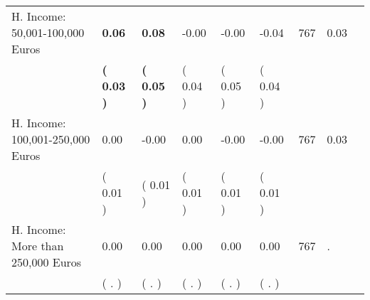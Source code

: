 \begin{tabular}{L{6.2cm} C{1.8cm} C{1.8cm} C{1.8cm} C{1.8cm} C{1.8cm} C{1.8cm} C{0.3cm} C{0.3cm}}
H. Income: 50,001-100,000 Euros & \textbf{     0.06} & \textbf{     0.08} &     -0.00 &     -0.00 &     -0.04  & 767 &       0.03 \\ 
 & \textbf{(     0.03 )} & \textbf{(     0.05 )} & (     0.04 ) & (     0.05 ) & (     0.04 )  & \\
H. Income: 100,001-250,000 Euros &      0.00 &     -0.00 &      0.00 &     -0.00 &     -0.00  & 767 &       0.03 \\ 
 & (     0.01 ) & (     0.01 ) & (     0.01 ) & (     0.01 ) & (     0.01 )  & \\
H. Income: More than 250,000 Euros &      0.00 &      0.00 &      0.00 &      0.00 &      0.00  & 767 &          . \\ 
 & (        . ) & (        . ) & (        . ) & (        . ) & (        . )  & \\
\bottomrule
\end{tabular}
